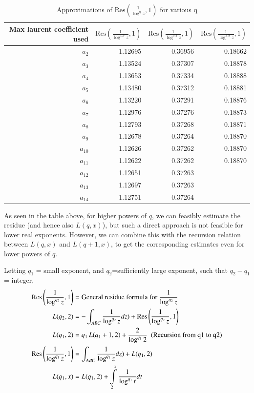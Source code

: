 \documentclass[a4paper,11pt,twoside]{amsart}
\newcommand\Res{\mathrm{Res}}
\begin{document}
\begin{table}[H]
  \begin{center}
    \begin{tabular}{r|r|r|r} %
      Max laurent coefficient used & $\Res\left(\frac{1}{\log^{1.5} z},1\right)$ & $\Res\left(\frac{1}{\log^{3.3} z},1\right)$ & $\Res\left(\frac{1}{\log^{3.9} z},1\right)$	\\
      \hline
      $a_2$ &  1.12695 & 0.36956 & 0.18662\\
      $a_3$ &  1.13524 & 0.37307 & 0.18878\\
      $a_4$ &  1.13653 & 0.37334 & 0.18888\\
      $a_5$ &  1.13480 & 0.37312 & 0.18881\\
      $a_6$ &  1.13220 & 0.37291 & 0.18876\\
      $a_7$ &  1.12976 & 0.37276 & 0.18873\\
      $a_8$ &  1.12793 & 0.37268 & 0.18871\\
      $a_9$ &  1.12678 & 0.37264 & 0.18870\\
      $a_{10}$ & 1.12626 & 0.37262 & 0.18870\\
      $a_{11}$ & 1.12622 & 0.37262 & 0.18870\\
      $a_{12}$ & 1.12651 & 0.37263 & \\
      $a_{13}$ & 1.12697 & 0.37263 & \\
      $a_{14}$ & 1.12751 & 0.37264 & \\
    \end{tabular}
  \caption{Approximations of $\Res\left(\frac{1}{\log^{q} z},1\right)$ for various q}
  \end{center}
\end{table}
\vspace{-2em}
As seen in the table above, for higher powers of $q$, we can feasibly estimate the residue (and hence also $L(q,x)$), but such a direct approach is not feasible for lower real exponents. However, we can combine this with the recursion relation between $L(q,x)$ and $L(q+1,x)$, to get the corresponding estimates even for lower powers of $q$.

Letting $q_1$ = small exponent, and $q_2$=sufficiently large exponent, such that $q_2 - q_1$ = integer, 
\begin{align}
\Res\left(\frac{1}{\log^{q_2} z},1\right) &= \text{General residue formula for } \frac{1}{\log^{q_2} z} \notag \\
L(q_2,2) &= -\int_{ABC} \frac{1}{\log^{q_2} z} dz) + \Res\left(\frac{1}{\log^{q_2} z},1\right)\notag \\
L(q_1,2) &= {q_1}\,L(q_1 + 1,2) + \frac{2}{\log^{q_1} 2} \,\,\,\text{(Recursion from q1 to q2)} \notag\\
\Res\left(\frac{1}{\log^{q_1} z},1\right) &= \int_{ABC} \frac{1}{\log^{q_1} z} dz) + L(q_1,2)\notag \\
L(q_1,x) &= L(q_1,2) + \int\limits_{2}^{x}\frac{1}{\log^{q_1} t} dt\notag 
\notag
\end{align}
\end{document}
